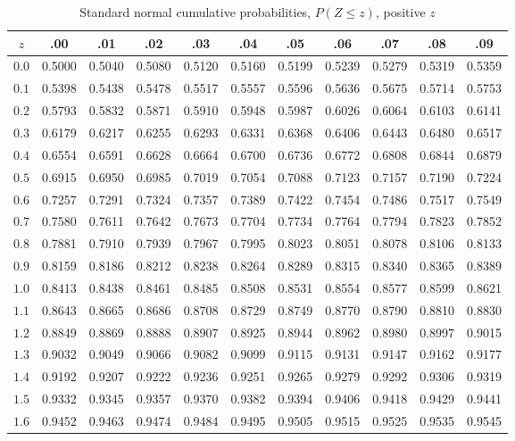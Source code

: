 \begin{table}[H]
\centering
\small
\caption{Standard normal cumulative probabilities, $P(Z \le z)$, positive $z$}
\label{tab:z-positive}
\begin{tabular}{c|cccccccccc}
$z$ & .00 & .01 & .02 & .03 & .04 & .05 & .06 & .07 & .08 & .09 \\
\hline
$0.0$ & 0.5000 & 0.5040 & 0.5080 & 0.5120 & 0.5160 & 0.5199 & 0.5239 & 0.5279 & 0.5319 & 0.5359 \\
$0.1$ & 0.5398 & 0.5438 & 0.5478 & 0.5517 & 0.5557 & 0.5596 & 0.5636 & 0.5675 & 0.5714 & 0.5753 \\
$0.2$ & 0.5793 & 0.5832 & 0.5871 & 0.5910 & 0.5948 & 0.5987 & 0.6026 & 0.6064 & 0.6103 & 0.6141 \\
$0.3$ & 0.6179 & 0.6217 & 0.6255 & 0.6293 & 0.6331 & 0.6368 & 0.6406 & 0.6443 & 0.6480 & 0.6517 \\
$0.4$ & 0.6554 & 0.6591 & 0.6628 & 0.6664 & 0.6700 & 0.6736 & 0.6772 & 0.6808 & 0.6844 & 0.6879 \\
$0.5$ & 0.6915 & 0.6950 & 0.6985 & 0.7019 & 0.7054 & 0.7088 & 0.7123 & 0.7157 & 0.7190 & 0.7224 \\
$0.6$ & 0.7257 & 0.7291 & 0.7324 & 0.7357 & 0.7389 & 0.7422 & 0.7454 & 0.7486 & 0.7517 & 0.7549 \\
$0.7$ & 0.7580 & 0.7611 & 0.7642 & 0.7673 & 0.7704 & 0.7734 & 0.7764 & 0.7794 & 0.7823 & 0.7852 \\
$0.8$ & 0.7881 & 0.7910 & 0.7939 & 0.7967 & 0.7995 & 0.8023 & 0.8051 & 0.8078 & 0.8106 & 0.8133 \\
$0.9$ & 0.8159 & 0.8186 & 0.8212 & 0.8238 & 0.8264 & 0.8289 & 0.8315 & 0.8340 & 0.8365 & 0.8389 \\
$1.0$ & 0.8413 & 0.8438 & 0.8461 & 0.8485 & 0.8508 & 0.8531 & 0.8554 & 0.8577 & 0.8599 & 0.8621 \\
$1.1$ & 0.8643 & 0.8665 & 0.8686 & 0.8708 & 0.8729 & 0.8749 & 0.8770 & 0.8790 & 0.8810 & 0.8830 \\
$1.2$ & 0.8849 & 0.8869 & 0.8888 & 0.8907 & 0.8925 & 0.8944 & 0.8962 & 0.8980 & 0.8997 & 0.9015 \\
$1.3$ & 0.9032 & 0.9049 & 0.9066 & 0.9082 & 0.9099 & 0.9115 & 0.9131 & 0.9147 & 0.9162 & 0.9177 \\
$1.4$ & 0.9192 & 0.9207 & 0.9222 & 0.9236 & 0.9251 & 0.9265 & 0.9279 & 0.9292 & 0.9306 & 0.9319 \\
$1.5$ & 0.9332 & 0.9345 & 0.9357 & 0.9370 & 0.9382 & 0.9394 & 0.9406 & 0.9418 & 0.9429 & 0.9441 \\
$1.6$ & 0.9452 & 0.9463 & 0.9474 & 0.9484 & 0.9495 & 0.9505 & 0.9515 & 0.9525 & 0.9535 & 0.9545 \\

\end{tabular}
\end{table}
